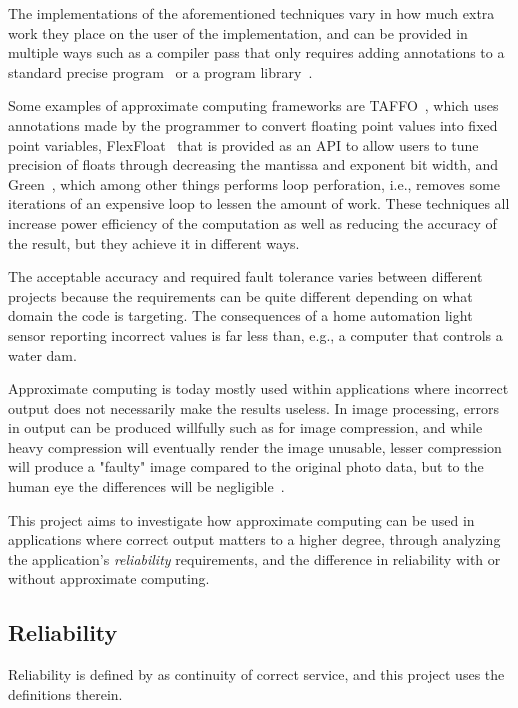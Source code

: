 The implementations of the aforementioned techniques vary in how much extra work they place on the user of the implementation, and can be provided in multiple ways such as a compiler pass that only requires adding annotations to a standard precise program~\citep{cherubin2019taffo, sharif2021approxtuner} or a program library~\citep{mirsalari2023translib, tagliavini2018flexfloat}.

Some examples of approximate computing frameworks are TAFFO~\citep{cherubin2019taffo}, which uses annotations made by the programmer to convert floating point values into fixed point variables, FlexFloat~\citep{tagliavini2018flexfloat} that is provided as an API to allow users to tune precision of floats through decreasing the mantissa and exponent bit width, and Green~\citep{baek2010green}, which among other things performs loop perforation, i.e., removes some iterations of an expensive loop to lessen the amount of work. These techniques all increase power efficiency of the computation as well as reducing the accuracy of the result, but they achieve it in different ways.

The acceptable accuracy and required fault tolerance varies between different projects because the requirements can be quite different depending on what domain the code is targeting. The consequences of a home automation light sensor reporting incorrect values is far less than, e.g., a computer that controls a water dam.



Approximate computing is today mostly used within applications where incorrect output does not necessarily make the results useless. In image processing, errors in output can be produced willfully such as for image compression, and while heavy compression will eventually render the image unusable, lesser compression will produce a "faulty" image compared to the original photo data, but to the human eye the differences will be negligible~\citep{subramanya2001image}.

This project aims to investigate how approximate computing can be used in applications where correct output matters to a higher degree, through analyzing the application's {\em reliability} requirements, and the difference in reliability with or without approximate computing.


\subsection{Reliability}
Reliability is defined by \citet{avizienis2004basic} as continuity of correct service, and this project uses the definitions therein.

